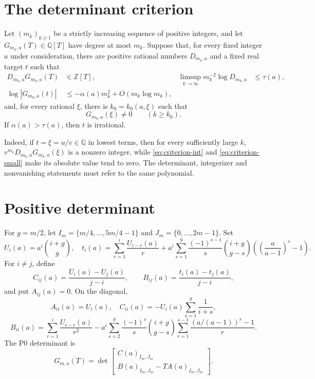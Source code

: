 \documentclass{amsart}
\numberwithin{equation}{section}
\numberwithin{table}{section}
\newcommand{\Z}{\mathbb Z}
\newcommand{\Q}{\mathbb Q}
\begin{document}
\section{The determinant criterion}\label{sec:criterion}
Let \((m_k)_{k\ge1}\) be a strictly increasing sequence of positive integers,
and let \(G_{m_k,a}(T)\in\Q[T]\) have degree at most \(m_k\).  Suppose that,
for every fixed integer \(a\) under consideration, there are positive
rational numbers \(D_{m_k,a}\)
 and a fixed real target \(t\) such that
\begin{align}
 D_{m_k,a}G_{m_k,a}(T)&\in\Z[T], &
 \limsup_{k\to\infty}m_k^{-2}\log D_{m_k,a}&\le\tau(a), \label{eq:criterion-int}\\
 \log|G_{m_k,a}(t)|&\le-\alpha(a)m_k^2+O(m_k\log m_k), \label{eq:criterion-small}
\end{align}
and, for every rational \(\xi\), there is \(k_0=k_0(a,\xi)\) such that
\[
 G_{m_k,a}(\xi)\ne0\qquad(k\ge k_0).
\]
If
\(\alpha(a)>\tau(a)\), then \(t\) is irrational.

Indeed, if \(t=\xi=u/v\in\Q\) in lowest terms, then for every sufficiently
large \(k\),
\(v^{m_k}D_{m_k,a}G_{m_k,a}(\xi)\) is a nonzero integer, while
\eqref{eq:criterion-int} and \eqref{eq:criterion-small} make its absolute
value tend to zero.  The determinant, integerizer and nonvanishing statements
must refer to the same polynomial.

\section{Positive determinant}\label{sec:p0}
For \(g=m/2\), let \(I_m=\{m/4,\ldots,5m/4-1\}\) and
\(J_m=\{0,\ldots,2m-1\}\).  Set
\[
 U_i(a)=a^i\binom{i+g}{g},\quad
 t_i(a)=\sum_{r=1}^i\frac{U_{i-r}(a)}r
 +a^i\sum_{s=1}^g\frac{(-1)^{s-1}}s
       \binom{i+g}{g-s}\left(\left(\frac a{a-1}\right)^s-1\right).
\]
For \(i\ne j\), define
\[
 C_{ij}(a)=\frac{U_i(a)-U_j(a)}{j-i},\qquad
 B_{ij}(a)=\frac{t_i(a)-t_j(a)}{j-i},
\]
and put \(A_{ij}(a)=0\).  On the diagonal,
\[
 A_{ii}(a)=U_i(a),\quad C_{ii}(a)=-U_i(a)\sum_{s=1}^g\frac1{i+s},
\]
\[
 B_{ii}(a)=\sum_{r=1}^i\frac{U_{i-r}(a)}{r^2}
 -a^i\sum_{s=2}^g\frac{(-1)^s}{s}\binom{i+g}{g-s}
       \sum_{r=1}^{s-1}\frac{(a/(a-1))^r-1}{r}.
\]
The P0 determinant is
\begin{equation}\label{eq:p0det}
 G_{m,a}(T)=\det\begin{bmatrix}C(a)_{I_m,J_m}\\
                      B(a)_{I_m,J_m}-T A(a)_{I_m,J_m}\end{bmatrix}.
\end{equation}

\end{document}
